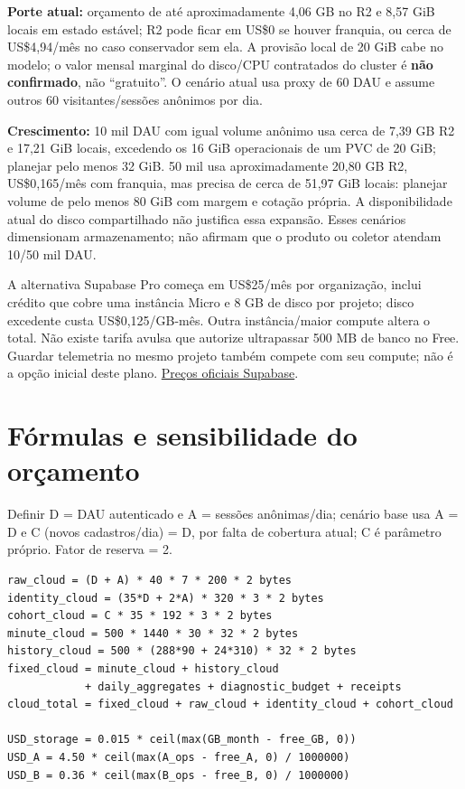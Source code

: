 \documentclass[10pt,a4paper]{article}
\begin{document}
\textbf{Porte atual:} orçamento de até aproximadamente 4,06 GB no R2 e
8,57 GiB locais em estado estável; R2 pode ficar em US\$0 se houver
franquia, ou cerca de US\$4,94/mês no caso conservador sem ela. A
provisão local de 20 GiB cabe no modelo; o valor mensal marginal do
disco/CPU contratados do cluster é \textbf{não confirmado}, não
``gratuito''. O cenário atual usa proxy de 60 DAU e assume outros 60
visitantes/sessões anônimos por dia.

\textbf{Crescimento:} 10 mil DAU com igual volume anônimo usa cerca de
7,39 GB R2 e 17,21 GiB locais, excedendo os 16 GiB operacionais de um
PVC de 20 GiB; planejar pelo menos 32 GiB. 50 mil usa aproximadamente
20,80 GB R2, US\$0,165/mês com franquia, mas precisa de cerca de 51,97
GiB locais: planejar volume de pelo menos 80 GiB com margem e cotação
própria. A disponibilidade atual do disco compartilhado não justifica
essa expansão. Esses cenários dimensionam armazenamento; não afirmam que
o produto ou coletor atendam 10/50 mil DAU.

A alternativa Supabase Pro começa em US\$25/mês por organização, inclui
crédito que cobre uma instância Micro e 8 GB de disco por projeto; disco
excedente custa US\$0,125/GB-mês. Outra instância/maior compute altera o
total. Não existe tarifa avulsa que autorize ultrapassar 500 MB de banco
no Free. Guardar telemetria no mesmo projeto também compete com seu
compute; não é a opção inicial deste plano.
\href{https://supabase.com/pricing}{Preços oficiais Supabase}.

\clearpage
\section{Fórmulas e sensibilidade do
orçamento}\label{fuxf3rmulas-e-sensibilidade-do-oruxe7amento}

Definir D = DAU autenticado e A = sessões anônimas/dia; cenário base usa
A = D e C (novos cadastros/dia) = D, por falta de cobertura atual; C é
parâmetro próprio. Fator de reserva = 2.

\begin{verbatim}
raw_cloud = (D + A) * 40 * 7 * 200 * 2 bytes
identity_cloud = (35*D + 2*A) * 320 * 3 * 2 bytes
cohort_cloud = C * 35 * 192 * 3 * 2 bytes
minute_cloud = 500 * 1440 * 30 * 32 * 2 bytes
history_cloud = 500 * (288*90 + 24*310) * 32 * 2 bytes
fixed_cloud = minute_cloud + history_cloud
            + daily_aggregates + diagnostic_budget + receipts
cloud_total = fixed_cloud + raw_cloud + identity_cloud + cohort_cloud

USD_storage = 0.015 * ceil(max(GB_month - free_GB, 0))
USD_A = 4.50 * ceil(max(A_ops - free_A, 0) / 1000000)
USD_B = 0.36 * ceil(max(B_ops - free_B, 0) / 1000000)
\end{verbatim}
\end{document}
